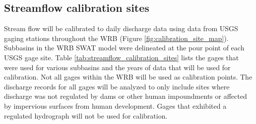 \subsection{Streamflow calibration sites}\label{sec:streamflow_calibration_sites}

Stream flow will be calibrated to daily discharge data using data from USGS gaging stations throughout the WRB (Figure \ref{fig:calibration_site_map}). 
Subbasins in the WRB SWAT model were delineated at the pour point of each USGS gage site. 
Table \ref{tab:streamflow_calibration_sites} lists the gages that were used for various subbasins and the years of data that will be used for calibration. Not all gages within the WRB will be used as calibration points. 
The discharge records for all gages will be analyzed to only include sites where discharge was not regulated by dams or other human impoundments or affected by impervious surfaces from human development.
 Gages that exhibited a regulated hydrograph will not be used for calibration.
